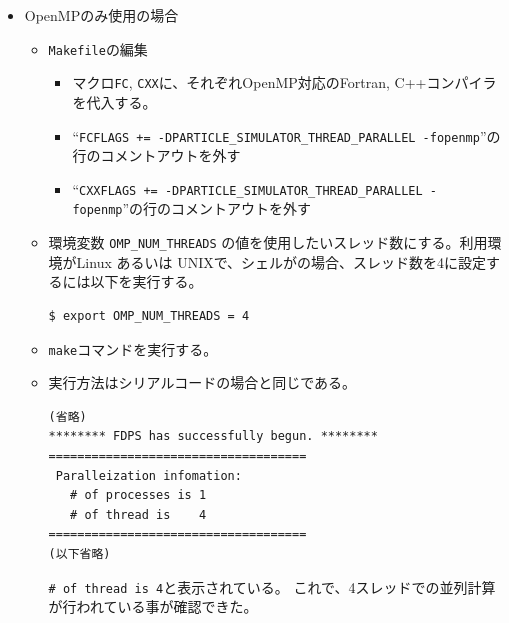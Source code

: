 \documentclass[12pt,a4paper,dvipdfmx]{jarticle}
\begin{document}
\begin{itemize}
\item OpenMPのみ使用の場合
  \begin{itemize}
  \item \texttt{Makefile}の編集
    \begin{itemize}
    \item マクロ\texttt{FC}, \texttt{CXX}に、それぞれOpenMP対応のFortran, C++コンパイラを代入する。
        \item ``\texttt{FCFLAGS += -DPARTICLE\_SIMULATOR\_THREAD\_PARALLEL -fopenmp}''の行のコメントアウトを外す
    \item ``\texttt{CXXFLAGS += -DPARTICLE\_SIMULATOR\_THREAD\_PARALLEL -fopenmp}''の行のコメントアウトを外す
    \end{itemize}
  \item 環境変数 \texttt{OMP\_NUM\_THREADS} の値を使用したいスレッド数にする。利用環境がLinux あるいは UNIXで、シェルがの場合、スレッド数を4に設定するには以下を実行する。
\begin{screen}
\begin{verbatim}
$ export OMP_NUM_THREADS = 4
\end{verbatim}
\end{screen}
  \item \texttt{make}コマンドを実行する。
  \item 実行方法はシリアルコードの場合と同じである。

\begin{screen}
\begin{verbatim}
(省略)
******** FDPS has successfully begun. ********
====================================
 Paralleization infomation:
   # of processes is 1
   # of thread is    4
====================================
(以下省略)
\end{verbatim}
\end{screen}
       \texttt{\# of thread is    4}と表示されている。
       これで、4スレッドでの並列計算が行われている事が確認できた。
\end{itemize}


\end{itemize}
\end{document}
